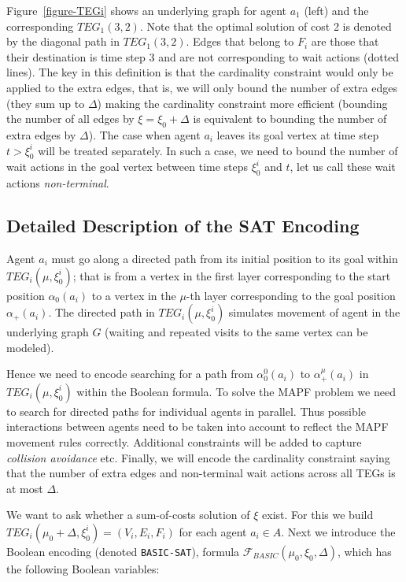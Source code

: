 \documentclass[jair,oneside,11pt]{article}
\begin{document}
Figure~\ref{figure-TEGi} shows an underlying graph for agent $a_1$ (left) and the corresponding $TEG_1(3,2)$. Note that the optimal solution of cost 2 is denoted by the diagonal path in $TEG_1(3,2)$. Edges that belong to $F_i$ are those that their destination is time step 3 and are not corresponding to wait actions (dotted lines). The key in this definition is that the cardinality constraint would only be applied to the extra edges, that is, we will only bound the number of extra edges (they sum up to $\Delta$) making the cardinality constraint more efficient (bounding the number of all edges by $\xi = \xi_0 + \Delta$ is equivalent to bounding the number of extra edges by $\Delta$). The case when agent $a_i$ leaves its goal vertex at time step $t > \xi^i_0$ will be treated separately. In such a case, we need to bound the number of wait actions in the goal vertex between time steps $\xi^i_0$ and $t$, let us call these wait actions {\em non-terminal}.

\subsection{Detailed Description of the SAT Encoding}
\label{sec:detailedDescription}

\noindent Agent $a_i$ must go along a directed path from its initial position to its goal within $TEG_i(\mu,\xi^i_0)$; that is from a vertex in the first layer corresponding to the start position $\alpha_0(a_i)$ to a vertex in the $\mu$-th layer corresponding to the goal position $\alpha_+(a_i)$. The directed path in $TEG_i(\mu,\xi^i_0)$ simulates movement of agent in the underlying graph $G$ (waiting and repeated visits to the same vertex can be modeled).

Hence we need to encode searching for a path from $\alpha_0^0(a_i)$ to $\alpha_+^\mu(a_i)$ in $TEG_i(\mu,\xi^i_0)$ within the Boolean formula. To solve the MAPF problem we need to search for directed paths for individual agents in parallel. Thus possible interactions between agents need to be taken into account to reflect the MAPF movement rules correctly. Additional constraints will be added to capture \textit{collision avoidance} etc. Finally, we will encode the cardinality constraint saying that the number of extra edges and non-terminal wait actions across all TEGs is at most $\Delta$.

We want to ask whether a sum-of-costs solution of $\xi$ exist. For this we build $TEG_i(\mu_0 + \Delta,\xi^i_0)=(V_i,E_i,F_i)$ for each agent $a_i \in A$. Next we introduce the Boolean encoding (denoted \texttt{BASIC-SAT}), formula $\mathcal{F}_{BASIC}(\mu_0, \xi_0, \Delta)$, which has the following Boolean variables:
\vspace{0.25cm}
\end{document}

